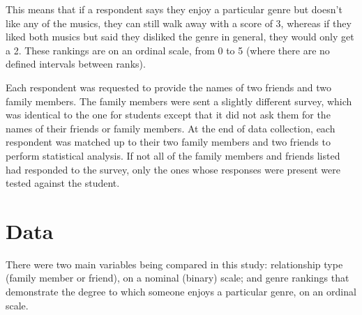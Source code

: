\documentclass[12pt]{report}
\begin{document}
This means that if a respondent says they enjoy a particular genre but doesn't like any of the musics, they can still walk away with a score of 3, whereas if they liked both musics but said they disliked the genre in general, they would only get a 2. These rankings are on an ordinal scale, from 0 to 5 (where there are no defined intervals between ranks).

Each respondent was requested to provide the names of two friends and two family members. The family members were sent a slightly different survey, which was identical to the one for students except that it did not ask them for the names of their friends or family members. At the end of data collection, each respondent was matched up to their two family members and two friends to perform statistical analysis. If not all of the family members and friends listed had responded to the survey, only the ones whose responses were present were tested against the student.

\chapter*{Data}
There were two main variables being compared in this study: relationship type (family member or friend), on a nominal (binary) scale; and genre rankings that demonstrate the degree to which someone enjoys a particular genre, on an ordinal scale.
\end{document}
